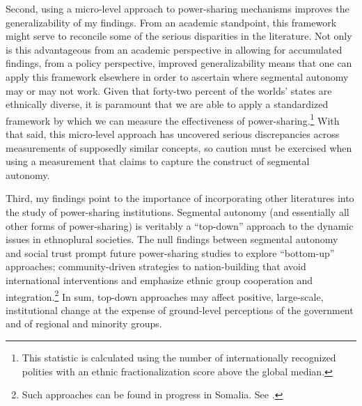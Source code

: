 \documentclass[12pt]{article}
\begin{document}
Second, using a micro-level approach to power-sharing mechanisms improves the generalizability of my findings. From an academic standpoint, this framework might serve to reconcile some of the serious disparities in the literature. Not only is this advantageous from an academic perspective in allowing for accumulated findings, from a policy perspective, improved generalizability means that one can apply this framework elsewhere in order to ascertain where segmental autonomy may or may not work. Given that forty-two percent of the worlds' states are ethnically diverse, it is paramount that we are able to apply a standardized framework by which we can measure the effectiveness of power-sharing.\footnote{This statistic is calculated using the number of internationally recognized polities with an ethnic fractionalization score above the global median.} With that said, this micro-level approach has uncovered serious discrepancies across measurements of supposedly similar concepts, so caution must be exercised when using a measurement that claims to capture the construct of segmental autonomy. 

Third, my findings point to the importance of incorporating other literatures into the study of power-sharing institutions. Segmental autonomy (and essentially all other forms of power-sharing) is veritably a ``top-down'' approach to the dynamic issues in ethnoplural societies. The null findings between segmental autonomy and social trust prompt future power-sharing studies to explore ``bottom-up'' approaches; community-driven strategies to nation-building that avoid international interventions and emphasize ethnic group cooperation and integration.\footnote{Such approaches can be found in progress in Somalia. See \cite{arteh_state-building_2016}.} In sum, top-down approaches may affect positive, large-scale, institutional change at the expense of ground-level perceptions of the government and of regional and minority groups.  
\end{document}
